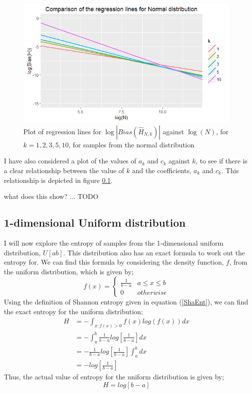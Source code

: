 \documentclass{article}
\begin{document}
\begin{figure}
  \begin{center}
    \includegraphics[width=\textwidth]{./Graphs/Normal_comparison.png}
  \end{center}
\caption{Plot of regression lines for $\log|Bias(\hat{H}_{N, k})|$ against $\log(N)$, for $k=1, 2, 3, 5, 10$, for samples from the normal distribution}
  \label{normal_comparison_graph}
\end{figure}

I have also considered a plot of the values of $a_{k}$ and $c_{k}$ against $k$, to see if there is a clear relationship between the value of $k$ and the coefficients,  $a_{k}$ and $c_{k}$. This relationship is depicted in figure \ref{}.

what does this show? ... TODO







\subsection{1-dimensional Uniform distribution}

I will now explore the entropy of samples from the 1-dimensional uniform distribution, $U[a b]$. This distribution also has an exact formula to work out the entropy for. We can find this formula by considering the density function, $f$, from the uniform distribution, which is given by;
\[
f(x) =  \begin{cases} 
      \frac{1}{b-a} & a \leq x \leq b \\
      0 & otherwise
   \end{cases}
\]
Using the definition of Shannon entropy given in equation (\ref{ShaEnt}), we can find the exact entropy for the uniform distribution;
\begin{align*}
H &= - \int_{x : f(x) > 0} f(x) log(f(x)) dx \\ 
&= - \int_{a}^{b} \frac{1}{b-a} log \left[ \frac{1}{b-a} \right] dx  \\
&= - \frac{1}{b-a} log \left[ \frac{1}{b-a} \right]  \int_{a}^{b} dx  \\
&= -  log  \left[ \frac{1}{b-a} \right] 
\end{align*}
Thus, the actual value of entropy for the uniform distribution is given by;
\begin{equation} \label{UnifEnt}
H = log [ b-a ]
\end{equation}
\end{document}
